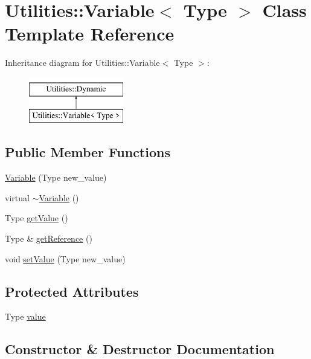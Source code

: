 \hypertarget{classUtilities_1_1Variable}{}\section{Utilities\+:\+:Variable$<$ Type $>$ Class Template Reference}
\label{classUtilities_1_1Variable}
Inheritance diagram for Utilities\+:\+:Variable$<$ Type $>$\+:\begin{figure}[H]
\begin{center}
\leavevmode
\includegraphics[height=2.000000cm]{classUtilities_1_1Variable}
\end{center}
\end{figure}
\subsection*{Public Member Functions}
\begin{DoxyCompactItemize}
\item 
\hyperlink{classUtilities_1_1Variable_af6f55d5d5c2472b25212828c66b730bc}{Variable} (Type new\+\_\+value)
\item 
virtual \hyperlink{classUtilities_1_1Variable_a4d2bce0bd082e8464b9f193d1e908e0a}{$\sim$\+Variable} ()
\item 
Type \hyperlink{classUtilities_1_1Variable_a2531a59e087062fab302cf487b6bdfa2}{get\+Value} ()
\item 
Type \& \hyperlink{classUtilities_1_1Variable_aec9b6becdc76afca1635280ab81ac41d}{get\+Reference} ()
\item 
void \hyperlink{classUtilities_1_1Variable_af218f1c4f50cbb2f69cc66e8150e05b3}{set\+Value} (Type new\+\_\+value)
\end{DoxyCompactItemize}
\subsection*{Protected Attributes}
\begin{DoxyCompactItemize}
\item 
Type \hyperlink{classUtilities_1_1Variable_ab91417296eea0614f336941a2ecc2944}{value}
\end{DoxyCompactItemize}


\subsection{Constructor \& Destructor Documentation}
